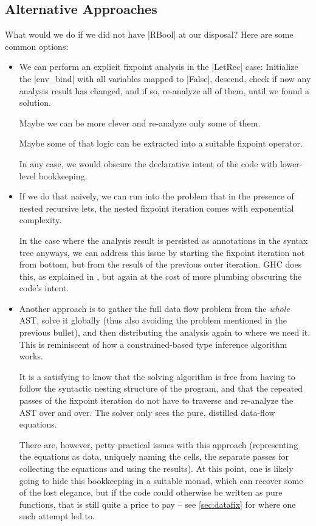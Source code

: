 \documentclass[manuscript,screen,acmsmall,nonacm]{acmart}
\begin{document}

\subsection{Alternative Approaches}\label{sec:casestudyalts}
What would we do if we did not have |RBool| at our disposal? Here are some common options:
\begin{itemize}
\item We can perform an explicit fixpoint analysis in the |LetRec| case: Initialize the |env_bind| with all variables mapped to |False|, descend, check if now any analysis result has changed, and if so, re-analyze all of them, until we found a solution.

Maybe we can be more clever and re-analyze only some of them.

Maybe some of that logic can be extracted into a suitable fixpoint operator.

In any case, we would obscure the declarative intent of the code with lower-level bookkeeping.

\item If we do that naively, we can run into the problem that in the presence of nested recursive lets, the nested fixpoint iteration comes with exponential complexity.

In the case where the analysis result is persisted as annotations in the syntax tree anyways, we can address this issue by starting the fixpoint iteration not from bottom, but from the result of the previous outer iteration.
%
GHC does this, as explained in \citet[Section 6.6]{modular}, but again at the cost of more plumbing obscuring the code's intent.

\item Another approach is to gather the full data flow problem from the \emph{whole} AST, solve it globally (thus also avoiding the problem mentioned in the previous bullet), and then distributing the analysis again to where we need it. This is reminiscent of how a constrained-based type inference algorithm works.

It is a satisfying to know that the solving algorithm is free from having to follow the syntactic nesting structure of the program, and that the repeated passes of the fixpoint iteration do not have to traverse and re-analyze the AST over and over. The solver only sees the pure, distilled data-flow equations.

There are, however, petty practical issues with this approach (representing the equations as data, uniquely naming the cells, the separate passes for collecting the equations and using the results).
At this point, one is likely going to hide this bookkeeping in a suitable monad, which can recover some of the lost elegance, but if the code could otherwise be written as pure functions, that is still quite a price to pay -- see \cref{sec:datafix} for where one such attempt led to.
\end{itemize}
\end{document}

